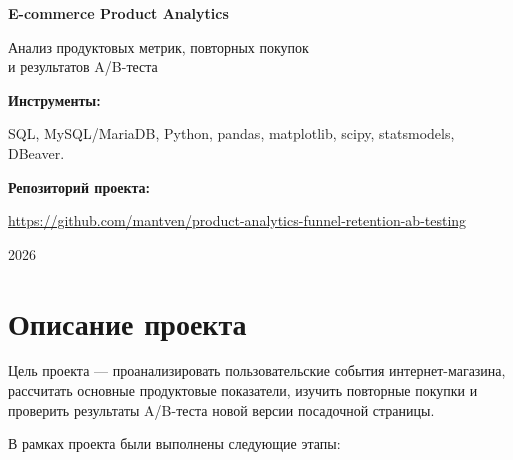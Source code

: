 \documentclass[12pt,a4paper]{extarticle}
\begin{document}

\begin{titlepage}

\begin{center}

\vspace*{2cm}

{\Large \textbf{E-commerce Product Analytics}}

\vspace{0.5cm}

{\large Анализ продуктовых метрик, повторных покупок\\
и результатов A/B-теста}

\vfill

\begin{flushleft}

\textbf{Инструменты:}

SQL, MySQL/MariaDB, Python, pandas, matplotlib, scipy,
statsmodels, DBeaver.

\vspace{0.7cm}

\textbf{Репозиторий проекта:}

\url{https://github.com/mantven/product-analytics-funnel-retention-ab-testing}

\end{flushleft}

\vfill

2026

\end{center}

\end{titlepage}

\tableofcontents

\clearpage

\section{Описание проекта}

Цель проекта --- проанализировать пользовательские события
интернет-магазина, рассчитать основные продуктовые показатели,
изучить повторные покупки и проверить результаты A/B-теста новой
версии посадочной страницы.

В рамках проекта были выполнены следующие этапы:
\end{document}
